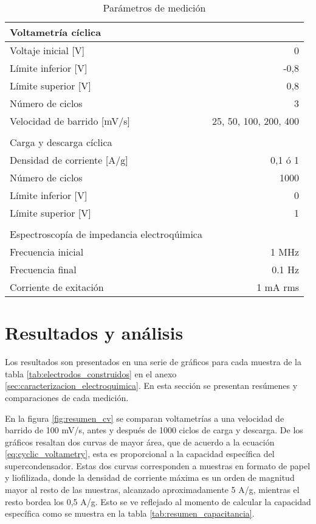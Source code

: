\begin{table}[h!]
	\centering
	\caption{Parámetros de medición}
	\begin{tabular}{ l r }
		Voltametría cíclica &  \\
		\hline
		Voltaje inicial [V] & 0 \\
		Límite inferior [V] & -0,8 \\
		Límite superior [V] & 0,8  \\
		Número de ciclos & 3 \\
		Velocidad de barrido [mV/s] & 25, 50, 100, 200, 400 \\
		& \\
		Carga y descarga cíclica & \\
		\hline
		Densidad de corriente [A/g] & 0,1 ó 	1 \\
		Número de ciclos & 1000 \\
		Límite inferior [V] & 0 \\
		Límite superior [V] & 1 \\
		& \\
		Espectroscopía de impedancia electroqúimica & \\
		\hline
		Frecuencia inicial	&	1 MHz \\
		Frecuencia final	&	0.1 Hz \\
		Corriente de exitación & 1 mA rms \\ 
	\end{tabular}
	\label{tab:elec_config}
\end{table}

\section{Resultados y análisis}

Los resultados son presentados en una serie de gráficos para cada muestra de la tabla \ref{tab:electrodos_construidos} en el anexo \ref{sec:caracterizacion_electroquimica}. En esta sección se presentan resúmenes y comparaciones de cada medición.

En la figura \ref{fig:resumen_cv} se comparan voltametrías a una velocidad de barrido de 100 mV/s, antes y después de 1000 ciclos de carga y descarga. De los gráficos resaltan dos curvas de mayor área, que de acuerdo a la ecuación \ref{eq:cyclic_voltametry}, esta es proporcional a la capacidad específica del supercondensador. Estas dos curvas corresponden a muestras en formato de papel y liofilizada, donde la densidad de corriente máxima es un orden de magnitud mayor al resto de las muestras, alcanzado aproximadamente 5 A/g, mientras el resto bordea los 0,5 A/g. Esto se ve reflejado al momento de calcular la capacidad específica como se muestra en la tabla \ref{tab:resumen_capacitancia}.

